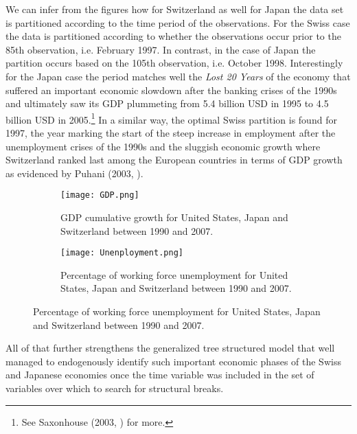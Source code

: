We can infer from the figures how for Switzerland as well for Japan
the data set is partitioned according to the time period of the
observations. For the Swiss case the data is partitioned according to
whether the observations occur prior to the 85th observation,
i.e. February 1997. In contrast, in the case of Japan the partition
occurs based on the 105th observation, i.e. October
1998. Interestingly for the Japan case the period matches well the
\textit{Lost 20 Years} of the economy that suffered an important
economic slowdown after the banking crises of the 1990s and ultimately
saw its GDP plummeting from 5.4 billion USD in 1995 to 4.5 billion USD
in 2005.\footnote{See Saxonhouse (2003, \cite{Saxonhouse}) for more.}
In a similar way, the optimal Swiss partition is found for 1997, the
year marking the start of the steep increase in employment after the
unemployment crises of the 1990s and the sluggish economic growth
where Switzerland ranked last among the European countries in terms of
GDP growth as evidenced by Puhani (2003, \cite{Puhani}).

\begin{figure}[htp]\vspace{2mm}
  \centering
  \caption[GDP and Unemployment level]{\textit{Cumulative GDP growth
      since 1990 and Unemployment level. The dotted line represents
      the time threshold chosen by the generalized tree structured
      model to fit the parametric structural model.}}
  \label{fig:macro}
  \begin{subfigure}[b]{0.4\linewidth} \label{subfig:gdp}
    \texttt{[image: GDP.png]}
    \caption{GDP cumulative growth for United States, Japan and
      Switzerland between 1990 and 2007.\\}
  \end{subfigure} \hspace{15mm} 
  \begin{subfigure}[b]{0.4\linewidth} \label{subfig:un}
    \texttt{[image: Unenployment.png]}
    \caption{Percentage of working force unemployment for United States, Japan and
      Switzerland between 1990 and 2007.}
  \end{subfigure}
  \vspace{0mm}
\end{figure}

All of that further strengthens the generalized tree structured model
that well managed to endogenously identify such important economic
phases of the Swiss and Japanese economies once the time variable was
included in the set of variables over which to search for structural
breaks.

